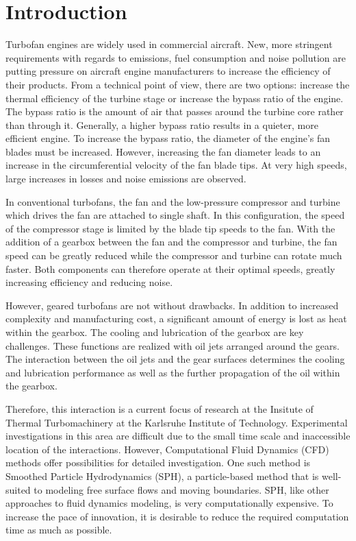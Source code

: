 \cleardoublepage


\chapter{Introduction}
\label{Chapter: Introduction}

Turbofan engines are widely used in commercial aircraft.  New, more stringent requirements with regards to emissions, fuel consumption and noise pollution are putting pressure on aircraft engine manufacturers to increase the efficiency of their products. From a technical point of view, there are two options: increase the thermal efficiency of the turbine stage or increase the bypass ratio of the engine. The bypass ratio is the amount of air that passes around the turbine core rather than through it.  Generally, a higher bypass ratio results in a quieter, more efficient engine. To increase the bypass ratio, the diameter of the engine's fan blades must be increased.  However, increasing the fan diameter leads to an increase in the circumferential velocity of the fan blade tips.  At very high speeds, large increases in losses and noise emissions are observed.

In conventional turbofans, the fan and the low-pressure compressor and turbine which drives the fan are attached to single shaft.  In this configuration, the speed of the compressor stage is limited by the blade tip speeds to the fan.  With the addition of a gearbox between the fan and the compressor and turbine, the fan speed can be greatly reduced while the compressor and turbine can rotate much faster.  Both components can therefore operate at their optimal speeds, greatly increasing efficiency and reducing noise.

However, geared turbofans are not without drawbacks.  In addition to increased complexity and manufacturing cost, a significant amount of energy is lost as heat within the gearbox.  The cooling and lubrication of the gearbox are key challenges.  These functions are realized with oil jets arranged around the gears.  The interaction between the oil jets and the gear surfaces determines the cooling and lubrication performance as well as the further propagation of the oil within the gearbox.

Therefore, this interaction is a current focus of research at the Insitute of Thermal Turbomachinery at the Karlsruhe Institute of Technology.  Experimental investigations in this area are difficult due to the small time scale and inaccessible location of the interactions. However, Computational Fluid Dynamics (CFD) methods offer possibilities for detailed investigation. One such method is Smoothed Particle Hydrodynamics (SPH), a particle-based method that is well-suited to modeling free surface flows and moving boundaries.  SPH, like other approaches to fluid dynamics modeling, is very computationally expensive. To increase the pace of innovation, it is desirable to reduce the required computation time as much as possible.

